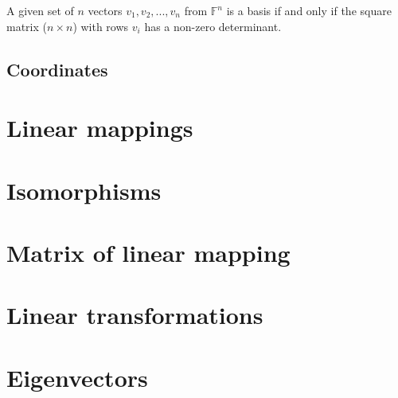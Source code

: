 \documentclass[12pt]{article}
\begin{document}
	\begin{thm}
		A given set of $n$ vectors $v_1, v_2, ..., v_n$ from $\mathbb{F}^n$ is a basis if and only if the square matrix ($n \times n$) with rows $v_i$ has a non-zero determinant.
	\end{thm}
	
	\subsection{Coordinates}
	

\section{Linear mappings}
\section{Isomorphisms}
\section{Matrix of linear mapping}
\section{Linear transformations}
\section{Eigenvectors}
\end{document}
